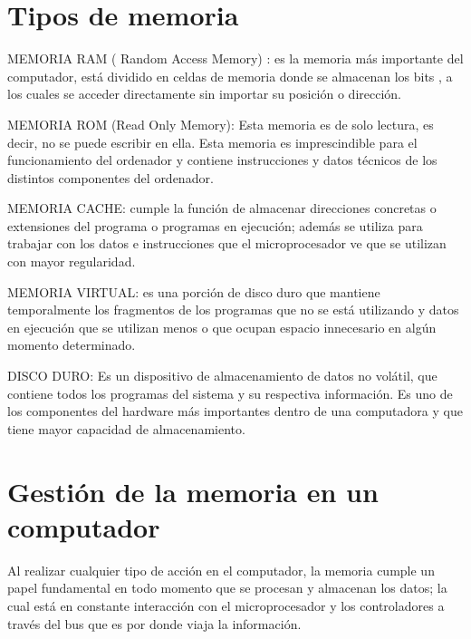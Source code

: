 \documentclass{article}
\begin{document}
\section{Tipos de memoria } \label{contenido}
MEMORIA RAM ( Random Access Memory) : es la memoria más importante del computador, está dividido en celdas de memoria donde se almacenan los bits , a los cuales  se acceder directamente sin importar su posición o dirección.\cite{tecdwebsite}
	
\vspace{0.5cm}
MEMORIA ROM (Read Only Memory): Esta memoria es de solo lectura, es decir, no se puede escribir en ella. Esta memoria es imprescindible para el funcionamiento del ordenador y contiene instrucciones y datos técnicos de los distintos componentes del ordenador.\cite{gestionwebsite}
    
\vspace{0.5cm}

MEMORIA CACHE: cumple la función de almacenar direcciones concretas o extensiones del programa o programas en ejecución; además se utiliza para trabajar con los datos e instrucciones que el microprocesador ve que se utilizan con mayor regularidad.

\vspace{0.5cm}

MEMORIA VIRTUAL: es una porción de disco duro que mantiene temporalmente los fragmentos de los programas que no se está utilizando y datos en ejecución que se utilizan menos o que ocupan espacio innecesario en algún momento determinado.

\vspace{0.5cm}

DISCO DURO: Es un dispositivo de almacenamiento de datos no volátil, que contiene todos los programas del sistema y su respectiva información. Es uno de los componentes del hardware más importantes dentro de una computadora y que tiene mayor capacidad de almacenamiento.

\vspace{0.5cm}

\section{Gestión de la memoria en un computador} \label{contenido}

Al realizar cualquier tipo de acción en el computador, la memoria cumple un papel fundamental en todo momento que se procesan y almacenan los datos; la cual está en constante interacción con el microprocesador y los controladores a través del bus que es por donde viaja la información.
\end{document}
